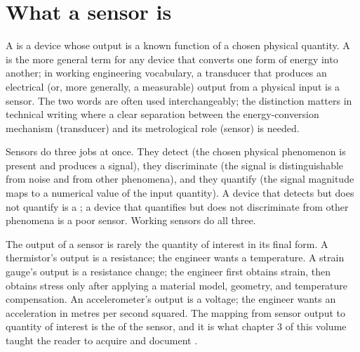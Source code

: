 

\section{What a sensor is}

A  is a device whose output is a known function of a
chosen physical quantity. A  is the more general
term for any device that converts one form of energy into another;
in working engineering vocabulary, a transducer that produces an
electrical (or, more generally, a measurable) output from a physical
input is a sensor. The two words are often used interchangeably; the
distinction matters in technical writing where a clear separation
between the energy-conversion mechanism (transducer) and its
metrological role (sensor) is needed.

Sensors do three jobs at once. They detect (the chosen physical
phenomenon is present and produces a signal), they discriminate (the
signal is distinguishable from noise and from other phenomena), and
they quantify (the signal magnitude maps to a numerical value of the
input quantity). A device that detects but does not quantify is a
; a device that quantifies but does not
discriminate from other phenomena is a poor sensor. Working sensors
do all three.

The output of a sensor is rarely the quantity of interest in its
final form. A thermistor's output is a resistance; the engineer
wants a temperature. A strain gauge's output is a resistance change;
the engineer first obtains strain, then obtains stress only after
applying a material model, geometry, and temperature compensation.
An accelerometer's output is a voltage; the engineer wants an
acceleration in metres per second squared. The mapping from sensor
output to quantity of interest is the 
of the sensor, and it is what chapter 3 of this volume taught the
reader to acquire and document
\cite{std:jcgm-vim}.

